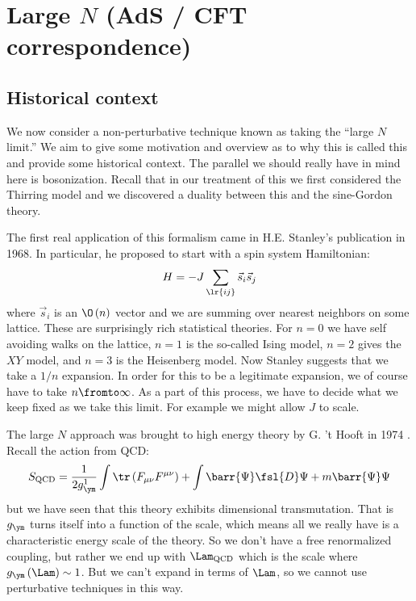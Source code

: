 \documentclass{booc}
\begin{document}
\chapter{Large \texorpdfstring{$N$}{N} (AdS / CFT correspondence)}

\section{Historical context}

We now consider a non-perturbative technique known as taking the
``large $N$ limit.'' We aim to give some motivation and overview as to why
this is called this and provide some historical context.
The parallel we should really have in mind here is bosonization.
Recall that in our treatment of this we first considered the Thirring model
and we discovered a duality between this and the sine-Gordon theory.

The first real application of this formalism came in H.E. Stanley's publication
\cite{stanley_68} in 1968.
In particular, he proposed to start with a spin system Hamiltonian:
\begin{equation}
H =  -J \sum_{\lr{ij}} \vec{s}_i \vec{s}_j
\end{equation}
where $\vec{s}_i$ is an $\O\left( n \right)$ vector
and we are summing over nearest neighbors on some lattice.
These are surprisingly rich statistical theories.
For $n = 0$ we have self avoiding walks on the lattice, 
$n = 1$ is the so-called Ising model, $n = 2$ 
gives the $XY$ model, and $n = 3$ is the Heisenberg model.
Now Stanley suggests that we take a $1/n$ expansion. 
In order for this to be a legitimate expansion, we of course have to take $n\fromto \infty$.
As a part of this process, we have to decide what we keep fixed as we take this limit.
For example we might allow $J$ to scale. 

The large $N$ approach was brought to high energy theory by G. 't Hooft in 1974
\cite{hooft_large_n}.
Recall the action from QCD:
\begin{equation}
S_{\text{QCD}} = \frac{1}{2 g_\ym^1} \int \tr\left( F_{\mu\nu} F^{\mu\nu} \right) + 
\int \barr{\Psi}\fsl{D} \Psi + m \barr{\Psi} \Psi
\end{equation}
but we have seen that this theory exhibits dimensional transmutation.
That is $g_\ym$ turns itself into a function of the scale, which means
all we really have is a characteristic energy scale of the theory.
So we don't have a free renormalized coupling, but rather
we end up with $\Lam_{\text{QCD}}$ which is 
the scale where $g_\ym\left( \Lam \right)\sim 1$. 
But we can't expand in terms of $\Lam$, so we cannot use perturbative techniques in this way. 
\end{document}
